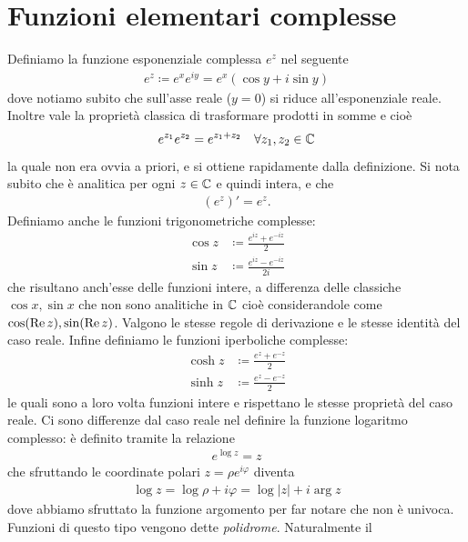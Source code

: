 \section{Funzioni elementari complesse}
Definiamo la funzione esponenziale complessa $ e^z $ nel seguente
\begin{align}
  e^z \coloneq e^x e^{iy} = e^x (\cos y + i \sin y)
\end{align}
dove notiamo subito che sull'asse reale ($ y = 0 $) si riduce all'esponenziale reale. Inoltre vale la proprietà classica di trasformare prodotti in somme 
e cioè 
\begin{align}
  e^{z_1} e^{z_2} = e^{z_1 + z_2} \quad \forall z_1,z_2 \in \mathbb{C}
\end{align}
la quale non era ovvia a priori, e si ottiene rapidamente dalla definizione. Si nota subito che è analitica per ogni $ z\in\mathbb{C} $ e quindi intera, e che 
\begin{align}
  (e^z)' = e^{z}.
\end{align}
Definiamo anche le funzioni trigonometriche complesse:
\begin{align}
  \cos z &\coloneq \frac{e^{iz} + e^{-iz}}{2}
  \\
  \sin z &\coloneq \frac{e^{iz} - e^{-iz}}{2i}
\end{align}
che risultano anch'esse delle funzioni intere, a differenza delle classiche $ \cos x , \sin x $ che non sono analitiche in $ \mathbb{C} $ cioè considerandole come  
$ \cos(\textnormal{Re} \,z), \sin(\textnormal{Re} \,z) $. Valgono le stesse regole di 
derivazione e le stesse identità del caso reale.
Infine definiamo le funzioni iperboliche complesse:
\begin{align}
  \cosh z &\coloneq \frac{e^{z} + e^{-z}}{2}
  \\
  \sinh z &\coloneq \frac{e^{z} - e^{-z}}{2}
\end{align}
le quali sono a loro volta funzioni intere e rispettano le stesse proprietà del caso reale.
Ci sono differenze dal caso reale nel definire la funzione logaritmo complesso: è definito tramite la relazione
\begin{align}
  e^{\log z} = z
\end{align}
che sfruttando le coordinate polari $ z = \rho e^{i\varphi} $ diventa 
\begin{align}
  \log z = \log \rho + i\varphi = \log |z| + i \arg z
\end{align}
dove abbiamo sfruttato la funzione argomento per far notare che non è univoca. Funzioni di questo tipo vengono dette \textit{polidrome}. Naturalmente il 
